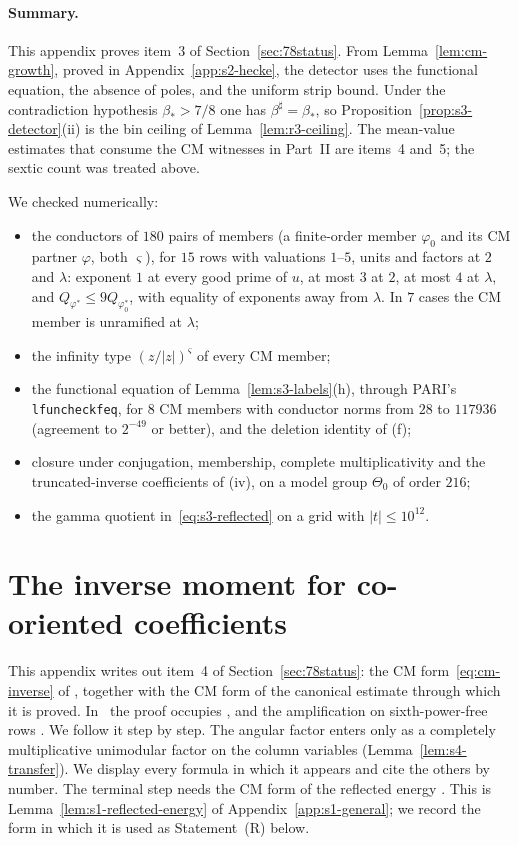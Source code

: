 \documentclass[11pt]{article}
\numberwithin{equation}{section}
\begin{document}
\paragraph{Summary.} This appendix proves item~3 of Section~\ref{sec:78status}. From Lemma~\ref{lem:cm-growth},
proved in Appendix~\ref{app:s2-hecke}, the detector uses the functional equation, the absence of poles, and the
uniform strip bound. Under the contradiction hypothesis $\beta_*>7/8$ one has $\beta^\sharp=\beta_*$, so
Proposition~\ref{prop:s3-detector}(ii) is the bin ceiling of Lemma~\ref{lem:r3-ceiling}. The mean-value estimates that consume the CM witnesses in Part~II are items~4
and~5; the sextic count was treated above.

We checked numerically:
\begin{itemize}
\item the conductors of $180$ pairs of members (a finite-order member $\varphi_0$ and its CM partner
 $\varphi$, both $\varsigma$), for $15$ rows with valuations
 $1$--$5$, units and factors at $2$ and $\lambda$: exponent $1$ at every good prime of $u$, at most $3$
 at $2$, at most $4$ at $\lambda$, and $Q_{\varphi^*}\le9Q_{\varphi_0^*}$, with equality of exponents away from
 $\lambda$. In $7$ cases the CM member is unramified at $\lambda$;
\item the infinity type $(z/|z|)^\varsigma$ of every CM member;
\item the functional equation of Lemma~\ref{lem:s3-labels}(h), through PARI's~\cite{PARI} \texttt{lfuncheckfeq}, for
 $8$ CM members with conductor norms from $28$ to $117936$ (agreement to $2^{-49}$ or better), and the deletion
 identity of (f);
\item closure under conjugation, membership, complete multiplicativity and the truncated-inverse
 coefficients of (iv), on a model group $\Theta_0$ of order $216$;
\item the gamma quotient in~\eqref{eq:s3-reflected} on a grid with $|t|\le10^{12}$.
\end{itemize}

\section{The inverse moment for co-oriented coefficients}\label{sec:s4-inverse}

This appendix writes out item~4 of Section~\ref{sec:78status}: the CM form~\eqref{eq:cm-inverse} of
\cite[Lemma~17.1]{OAI78}, together with the CM form of the canonical estimate
\cite[Lemma~17.2]{OAI78} through which it is proved. In~\cite{OAI78} the proof
occupies \cite[Section~17]{OAI78}, and the amplification on sixth-power-free rows \cite[Section~17.7]{OAI78}. We follow it step
by step. The angular factor enters only as a completely multiplicative unimodular factor on the column
variables (Lemma~\ref{lem:s4-transfer}). We display every formula in which it appears and cite the
others by number. The terminal step needs the CM form of the reflected energy
\cite[Lemma~14.3]{OAI78}. This is Lemma~\ref{lem:s1-reflected-energy} of
Appendix~\ref{app:s1-general}; we record the form in which it is used as Statement~(R) below.
\end{document}

